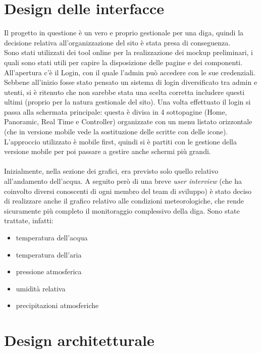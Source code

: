 \documentclass[a4paper,12pt]{report}
\begin{document}
\section{Design delle interfacce}\label{sec:design_interfacce}
Il progetto in questione è un vero e proprio gestionale per una diga, quindi la decisione relativa all'organizzazione del sito è stata presa di conseguenza.\\
Sono stati utilizzati dei tool online per la realizzazione dei mockup preliminari, i quali sono stati utili per capire la disposizione delle pagine e dei componenti.\\
All'apertura c'è il Login, con il quale l'admin può accedere con le sue credenziali. Sebbene all'inizio fosse stato pensato un sistema di login diversificato tra admin e utenti, si è ritenuto che non sarebbe stata una scelta corretta includere questi ultimi (proprio per la natura gestionale del sito). Una volta effettuato il login si passa alla schermata principale: questa è divisa in 4 sottopagine (Home, Panoramic, Real Time e Controller) organizzate con un menu listato orizzontale (che in versione mobile vede la sostituzione delle scritte con delle icone). L'approccio utilizzato è mobile first, quindi si è partiti con le gestione della versione mobile per poi passare a gestire anche schermi più grandi.\\\\
Inizialmente, nella sezione dei grafici, era previsto solo quello relativo all'andamento dell'acqua. A seguito però di una breve \emph{user interview} (che ha coinvolto diversi conoscenti di ogni membro del team di sviluppo) è stato deciso di realizzare anche il grafico relativo alle condizioni meteorologiche, che rende sicuramente più completo il monitoraggio complessivo della diga. Sono state trattate, infatti:
\begin{itemize}
    \item temperatura dell'acqua
    \item temperatura dell'aria
    \item pressione atmosferica
    \item umidità relativa
    \item precipitazioni atmosferiche
\end{itemize}

\section{Design architetturale}
\end{document}
